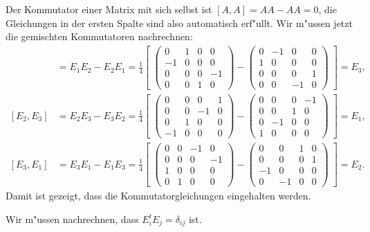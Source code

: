 \begin{loesung}
\begin{teilaufgaben}
\item
Der Kommutator einer Matrix mit sich selbst ist $[A,A]=AA-AA=0$, die
Gleichungen in der ersten Spalte sind also automatisch erf"ullt.
Wir m"ussen jetzt die gemischten Kommutatoren nachrechnen:
\begin{align*}
[E_1,E_2]&=E_1E_2-E_2E_1=\frac14\left[\;
\begin{pmatrix}
 0& 1& 0& 0\\
-1& 0& 0& 0\\
 0& 0& 0&-1\\
 0& 0& 1& 0
\end{pmatrix}
-
\begin{pmatrix}
 0&-1& 0& 0\\
 1& 0& 0& 0\\
 0& 0& 0& 1\\
 0& 0&-1& 0
\end{pmatrix}\;
\right]
=E_3,
\\
[E_2,E_3]&=E_2E_3-E_3E_2=\frac14\left[\;
\begin{pmatrix}
 0& 0& 0& 1\\
 0& 0&-1& 0\\
 0& 1& 0& 0\\
-1& 0& 0& 0
\end{pmatrix}
-
\begin{pmatrix}
 0& 0& 0&-1\\
 0& 0& 1& 0\\
 0&-1& 0& 0\\
 1& 0& 0& 0
\end{pmatrix}\;
\right]
=E_1,
\\
[E_3,E_1]&=E_3E_1-E_1E_3=\frac14\left[\;
\begin{pmatrix}
 0& 0&-1& 0\\
 0& 0& 0&-1\\
 1& 0& 0& 0\\
 0& 1& 0& 0
\end{pmatrix}
-
\begin{pmatrix}
 0& 0& 1& 0\\
 0& 0& 0& 1\\
-1& 0& 0& 0\\
 0&-1& 0& 0
\end{pmatrix}\;
\right]
=E_2.
\end{align*}
Damit ist gezeigt, dass die Kommutatorgleichungen eingehalten werden.
\item
Wir m"ussen nachrechnen, dass $E_i^tE_j=\delta_{ij}$ ist.

\end{teilaufgaben}
\end{loesung}
